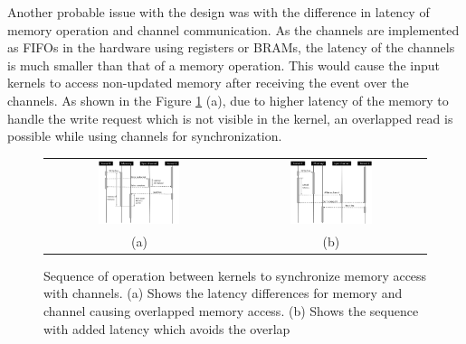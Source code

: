 Another probable issue with the design was with the difference in latency of memory operation
and channel communication. As the channels are implemented as FIFOs in the hardware
using registers or BRAMs, the latency of the channels is much smaller than that of a memory
operation. This would cause the input kernels to access non-updated memory after receiving the
event over the channels. As shown in the Figure \ref{fig:memchan_latency} (a), due to higher latency
of the memory to handle the write request which is not visible in the kernel, an overlapped
read is possible while using channels for synchronization.
\begin{figure}[h]
	\centering\small
	\begin{tabular}{c|c}
    \includegraphics[width=0.45\textwidth]{images/memchan_latency} & \includegraphics[width=0.45\textwidth]{images/resolved_latency}\\
    (a) & (b)
	\end{tabular}
    \caption{Sequence of operation between kernels to synchronize memory
    access with channels. (a) Shows the latency differences for memory and
    channel causing overlapped memory access. (b) Shows the sequence with
    added latency which avoids the overlap}
	\label{fig:memchan_latency}
\end{figure}

